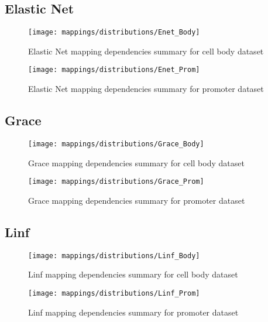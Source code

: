 \pagebreak
\subsection{Elastic Net}

\begin{figure}[H]
	\centering
	\texttt{[image: mappings/distributions/Enet\_Body]}
	\caption{Elastic Net mapping dependencies summary for cell body dataset}
	\label{fig:map_body_enet}
\end{figure}

\begin{figure}[H]
	\centering
	\texttt{[image: mappings/distributions/Enet\_Prom]}
	\caption{Elastic Net mapping dependencies summary for promoter dataset}
	\label{fig:map_prom_enet}
\end{figure}


\pagebreak
\subsection{Grace}

\begin{figure}[H]
	\centering
	\texttt{[image: mappings/distributions/Grace\_Body]}
	\caption{Grace mapping dependencies summary for cell body dataset}
	\label{fig:map_body_grace}
\end{figure}

\begin{figure}[H]
	\centering
	\texttt{[image: mappings/distributions/Grace\_Prom]}
	\caption{Grace mapping dependencies summary for promoter dataset}
	\label{fig:map_prom_grace}
\end{figure}


\pagebreak
\subsection{Linf}

\begin{figure}[H]
	\centering
	\texttt{[image: mappings/distributions/Linf\_Body]}
	\caption{Linf mapping dependencies summary for cell body dataset}
	\label{fig:map_body_linf}
\end{figure}

\begin{figure}[H]
	\centering
	\texttt{[image: mappings/distributions/Linf\_Prom]}
	\caption{Linf mapping dependencies summary for promoter dataset}
	\label{fig:map_prom_linf}
\end{figure}


